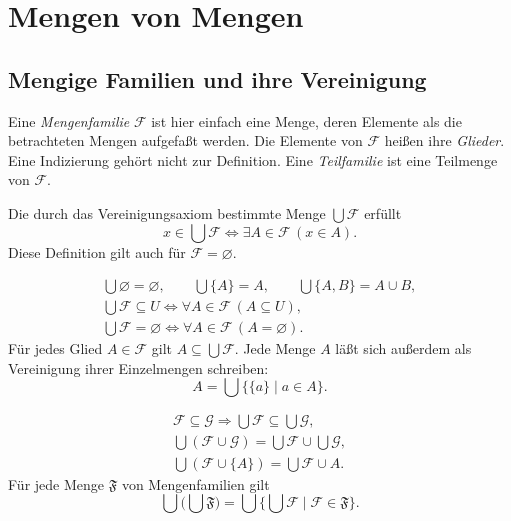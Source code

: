 \chapter{Mengen von Mengen}

\section{Mengige Familien und ihre Vereinigung}

\begin{definition}[Mengenfamilie]
Eine \emph{Mengenfamilie} $\mathcal F$ ist hier einfach eine Menge,
deren Elemente als die betrachteten Mengen aufgefaßt werden.
Die Elemente von $\mathcal F$ heißen ihre \emph{Glieder}.
Eine Indizierung gehört nicht zur Definition.
Eine \emph{Teilfamilie} ist eine Teilmenge von $\mathcal F$.
\end{definition}

\begin{definition}
Die durch das Vereinigungsaxiom bestimmte Menge $\bigcup\mathcal F$
erfüllt
\[
 x\in\bigcup\mathcal F
 \Longleftrightarrow \exists A\in\mathcal F\,(x\in A).
\]
Diese Definition gilt auch für $\mathcal F=\varnothing$.
\end{definition}

\begin{theorem}
\[
\begin{gathered}
 \bigcup\varnothing=\varnothing,\qquad
 \bigcup\{A\}=A,\qquad \bigcup\{A,B\}=A\cup B,\\
 \bigcup\mathcal F\subseteq U
   \Longleftrightarrow \forall A\in\mathcal F\,(A\subseteq U),\\
 \bigcup\mathcal F=\varnothing
   \Longleftrightarrow \forall A\in\mathcal F\,(A=\varnothing).
\end{gathered}
\]
Für jedes Glied $A\in\mathcal F$ gilt $A\subseteq\bigcup\mathcal F$.
Jede Menge $A$ läßt sich außerdem als Vereinigung ihrer
Einzelmengen schreiben:
\[
 A=\bigcup\{\{a\}\mid a\in A\}.
\]
\end{theorem}

\begin{theorem}
\[
\begin{gathered}
 \mathcal F\subseteq\mathcal G
      \Rightarrow\bigcup\mathcal F\subseteq\bigcup\mathcal G,\\
 \bigcup(\mathcal F\cup\mathcal G)
       =\bigcup\mathcal F\cup\bigcup\mathcal G,\\
 \bigcup(\mathcal F\cup\{A\})=\bigcup\mathcal F\cup A.
\end{gathered}
\]
Für jede Menge $\mathfrak F$ von Mengenfamilien gilt
\[
 \bigcup\bigl(\bigcup\mathfrak F\bigr)
       =\bigcup\{\bigcup\mathcal F\mid\mathcal F\in\mathfrak F\}.
\]
\end{theorem}

